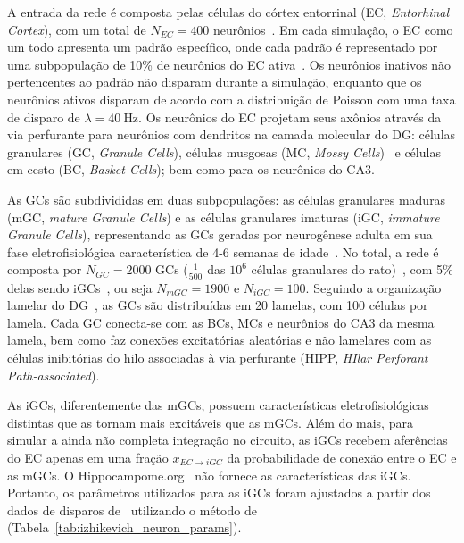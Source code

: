 A entrada da rede é composta pelas células do córtex entorrinal (EC, \textit{Entorhinal Cortex}), com um total de $N_{EC} = 400$
neurônios~\cite{amaralChapter1990,kimAdult2024}. Em cada simulação, o EC como um todo apresenta um padrão específico, onde cada
padrão é representado por uma subpopulação de 10\% de neurônios do EC ativa~\cite{mcnaughtonDead1991}. Os neurônios inativos não
pertencentes ao padrão não disparam durante a simulação, enquanto que os neurônios ativos disparam de acordo com a distribuição de
Poisson com uma taxa de disparo de $\lambda = \SI{40}{\hertz}$. Os neurônios do EC projetam seus axônios através da via perfurante
para neurônios com dendritos na camada molecular do DG: células granulares (GC, \textit{Granule Cells}), células musgosas (MC,
\textit{Mossy Cells})~\cite{scharfmanHilar2013} e células em cesto (BC, \textit{Basket Cells}); bem como para os neurônios do CA3.

As GCs são subdivididas em duas subpopulações: as células granulares maduras (mGC, \textit{mature Granule Cells}) e as células
granulares imaturas (iGC, \textit{immature Granule Cells}), representando as GCs geradas por neurogênese adulta em sua fase
eletrofisiológica característica de 4-6 semanas de idade~\cite{aimoneRegulation2014}. No total, a rede é composta por $N_{GC} =
2000$ GCs ($\frac{1}{500}$ das $10^6$ células granulares do rato)~\cite{westUnbiased1991}, com 5\% delas sendo
iGCs~\cite{cameronAdult2001}, ou seja $N_{mGC} = 1900$ e $N_{iGC} = 100$. Seguindo a organização lamelar do
DG~\cite{sloviterUpdating2012}, as GCs são distribuídas em 20 lamelas, com 100 células por lamela. Cada GC conecta-se com as BCs,
MCs e neurônios do CA3 da mesma lamela, bem como faz conexões excitatórias aleatórias e não lamelares com as células inibitórias
do hilo associadas à via perfurante (HIPP, \textit{HIlar Perforant Path-associated}).

As iGCs, diferentemente das mGCs, possuem características eletrofisiológicas distintas que as tornam mais excitáveis que as mGCs.
Além do mais, para simular a ainda não completa integração no circuito, as iGCs recebem aferências do EC apenas em uma fração
$x_{EC \to iGC}$ da probabilidade de conexão entre o EC e as mGCs. O Hippocampome.org~\cite{wheelerHippocampomeorg2023} não
fornece as características das iGCs. Portanto, os parâmetros utilizados para as iGCs foram ajustados a partir dos dados de
disparos de~ utilizando o método de~
(Tabela~\ref{tab:izhikevich_neuron_params}).

